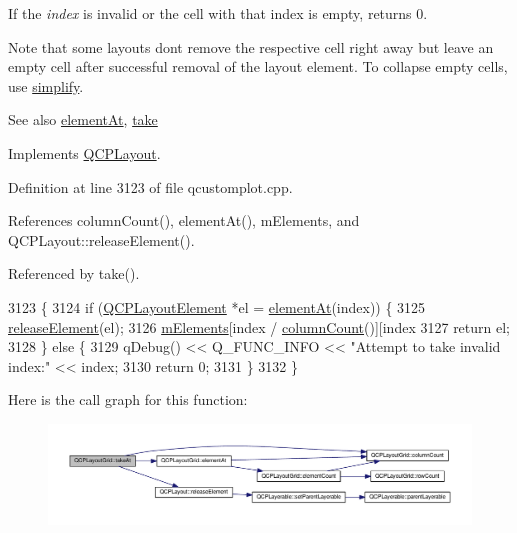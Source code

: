 If the {\itshape index} is invalid or the cell with that index is empty, returns 0.

Note that some layouts don\textquotesingle{}t remove the respective cell right away but leave an empty cell after successful removal of the layout element. To collapse empty cells, use \hyperlink{class_q_c_p_layout_grid_a08bba60e4acd20165526a8fd7f986b58}{simplify}.

\begin{DoxySeeAlso}{See also}
\hyperlink{class_q_c_p_layout_grid_a26849ee5c47b4c940e8d65e8462f1065}{element\+At}, \hyperlink{class_q_c_p_layout_grid_a666a9fe9e92054436f9b66eba25cca0c}{take} 
\end{DoxySeeAlso}


Implements \hyperlink{class_q_c_p_layout_a5a79621fa0a6eabb8b520cfc04fb601a}{Q\+C\+P\+Layout}.



Definition at line 3123 of file qcustomplot.\+cpp.



References column\+Count(), element\+At(), m\+Elements, and Q\+C\+P\+Layout\+::release\+Element().



Referenced by take().


\begin{DoxyCode}
3123                                                  \{
3124   \textcolor{keywordflow}{if} (\hyperlink{class_q_c_p_layout_element}{QCPLayoutElement} *el = \hyperlink{class_q_c_p_layout_grid_a26849ee5c47b4c940e8d65e8462f1065}{elementAt}(index)) \{
3125     \hyperlink{class_q_c_p_layout_a4afbb4bef0071f72f91afdac4433a18e}{releaseElement}(el);
3126     \hyperlink{class_q_c_p_layout_grid_a2ec4664bcfb5d479255e50f0c074f7c9}{mElements}[index / \hyperlink{class_q_c_p_layout_grid_ac39074eafd148b82d0762090f258189e}{columnCount}()][index %
3127     \textcolor{keywordflow}{return} el;
3128   \} \textcolor{keywordflow}{else} \{
3129     qDebug() << Q\_FUNC\_INFO << \textcolor{stringliteral}{"Attempt to take invalid index:"} << index;
3130     \textcolor{keywordflow}{return} 0;
3131   \}
3132 \}
\end{DoxyCode}


Here is the call graph for this function\+:\nopagebreak
\begin{figure}[H]
\begin{center}
\leavevmode
\includegraphics[width=350pt]{class_q_c_p_layout_grid_acc1277394ff8a6432e111ff9463e6375_cgraph}
\end{center}
\end{figure}




